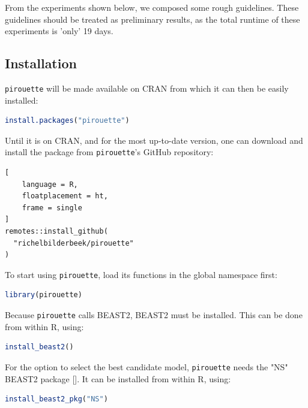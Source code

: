 From the experiments shown below, we composed some rough guidelines.
These guidelines should be treated as preliminary results, as
the total runtime of these experiments is 'only' 19 days.


\subsection{Installation}
\label{subsec:installation}

\verb;pirouette; will be made available on CRAN from which 
it can then be easily installed:
\begin{lstlisting}[language=R, floatplacement=ht, frame=single]
install.packages("pirouette")
\end{lstlisting}

Until it is on CRAN, and for the most up-to-date version, 
one can download and install the package from \verb;pirouette;'s GitHub 
repository:

\begin{lstlisting}[
    language = R,
    floatplacement = ht,
    frame = single
]
remotes::install_github(
  "richelbilderbeek/pirouette"
)
\end{lstlisting}
To start using \verb;pirouette;, 
load its functions in the global namespace first:
\begin{lstlisting}[language=R, floatplacement=ht, frame=single]
library(pirouette)
\end{lstlisting}
Because \verb;pirouette; calls BEAST2, BEAST2 must be installed. 
This can be done from within R, using:
\begin{lstlisting}[language=R, floatplacement=ht, frame=single]
install_beast2()
\end{lstlisting}
For the option to select the best candidate model,
\verb;pirouette; needs the "NS" BEAST2 package [\cite{russel2019model}].
It can be installed from within R, using:
\begin{lstlisting}[language=R, floatplacement=ht, frame=single]
install_beast2_pkg("NS")
\end{lstlisting}

